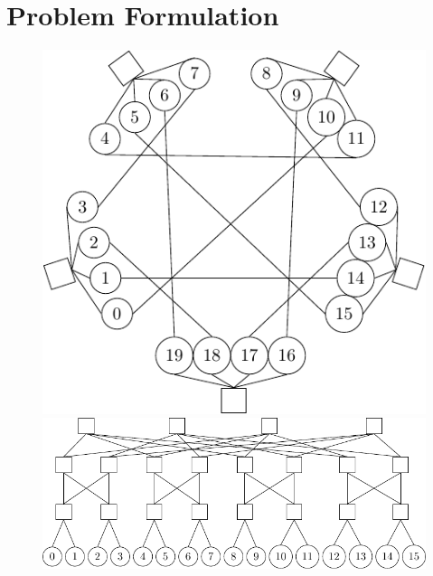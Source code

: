 \section{Problem Formulation}
\label{sec:problem_formulation}

\begin{figure}[t]
    \begin{minipage}{0.46\textwidth}
        \centering
        \includegraphics[width=1\textwidth]{figures/topologies/dcell-crop}
    \end{minipage}\hfill
    \begin{minipage}{.53\textwidth}
        \includegraphics[width=\textwidth]{figures/topologies/fattree}

        \vspace{2.5em}


\end{minipage}
\end{figure}
